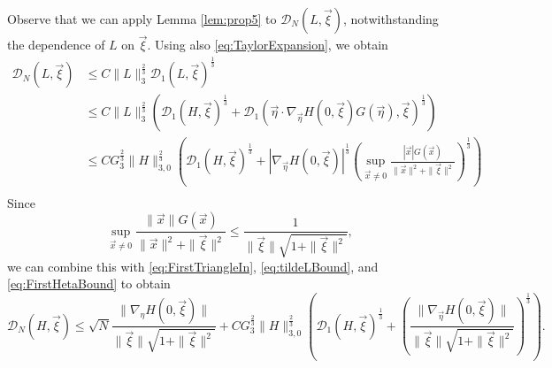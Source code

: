 \documentclass{article}
\newcommand\vxi{{\vec \xi}}
\begin{document}
Observe that we can apply Lemma \ref{lem:prop5} to $\mathcal D_N( L,\vxi)$, notwithstanding the dependence of $L$ on 
$\vxi$. Using also \eqref{eq:TaylorExpansion}, we obtain
\begin{equation}\label{eq:tildeLBound}
\begin{aligned}
\mathcal D_N( L,\vxi) &\leq C \|L\|_3^{\frac23} \mathcal D_1( L,\vxi)^{\frac 13}\\
&\leq C \|L\|_3^{\frac23} \left(\mathcal D_1(H,\vxi)^{\frac13} + \mathcal D_1(\vec\eta \cdot \nabla_{\vec \eta} H(0,\vxi) 
G(\vec \eta),\vxi)^{\frac13}\right)\\
&\leq C G_3^{\frac23} \|H\|_{3,0}^{\frac23} \left(\mathcal D_1(H,\vxi)^{\frac13} + |\nabla_{\vec\eta} H(0,\vxi)|^{\frac13} 
\left(\sup_{\vec x\ne 0}\frac{|\vec x|G(\vec x)}{\|\vec x\|^2 + \|\vxi\|^2}\right)^{\frac 13}\right)\\
\end{aligned}
\end{equation}
Since
\[
\sup_{\vec x\ne 0}\frac{\|\vec x\|G(\vec x)}{\|\vec x\|^2 + \|\vxi\|^2} \leq \frac{1}{\|\vxi\|\sqrt{1 + \|\vxi\|^2}},
\]
we can combine this with \eqref{eq:FirstTriangleIn}, \eqref{eq:tildeLBound}, and \eqref{eq:FirstHetaBound} to obtain
\begin{equation}\label{eq:ReductionToNabla}
\mathcal D_N(H,\vxi) \leq \sqrt{N}  \frac{\|\nabla_\eta H(0,\vxi)\|}{\|\vxi\|\sqrt{1 + \|\vxi\|^2}} + C
G_3^{\frac23}\|H\|_{3,0}^{\frac23} \left(\mathcal D_1(H,\vxi)^{\frac13} + \left(\frac{\|\nabla_{\vec\eta}
H(0,\vxi)\|}{\|\vxi\|\sqrt{1 + \|\vxi\|^2}}\right)^{\frac 13}\right).
\end{equation}
\end{document}
